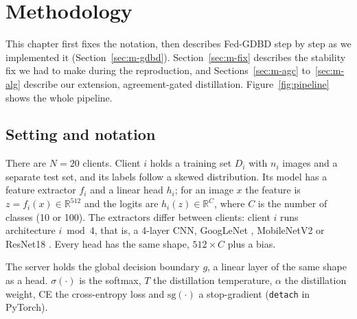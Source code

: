 \chapter{Methodology}
\label{ch:method}

This chapter first fixes the notation, then describes Fed-GDBD step by step as we implemented it (Section~\ref{sec:m-gdbd}). Section~\ref{sec:m-fix} describes the stability fix we had to make during the reproduction, and Sections~\ref{sec:m-agc} to~\ref{sec:m-alg} describe our extension, agreement-gated distillation. Figure~\ref{fig:pipeline} shows the whole pipeline.

\section{Setting and notation}

There are $N = 20$ clients. Client $i$ holds a training set $D_i$ with $n_i$ images and a separate test set, and its labels follow a skewed distribution. Its model has a feature extractor $f_i$ and a linear head $h_i$; for an image $x$ the feature is $z = f_i(x) \in \mathbb{R}^{512}$ and the logits are $h_i(z) \in \mathbb{R}^C$, where $C$ is the number of classes (10 or 100). The extractors differ between clients: client $i$ runs architecture $i \bmod 4$, that is, a 4-layer CNN, GoogLeNet \cite{szegedy2015googlenet}, MobileNetV2 \cite{sandler2018mobilenetv2} or ResNet18 \cite{he2016resnet}. Every head has the same shape, $512 \times C$ plus a bias.

The server holds the global decision boundary $g$, a linear layer of the same shape as a head. $\sigma(\cdot)$ is the softmax, $T$ the distillation temperature, $\alpha$ the distillation weight, CE the cross-entropy loss and $\mathrm{sg}(\cdot)$ a stop-gradient (\texttt{detach} in PyTorch).

